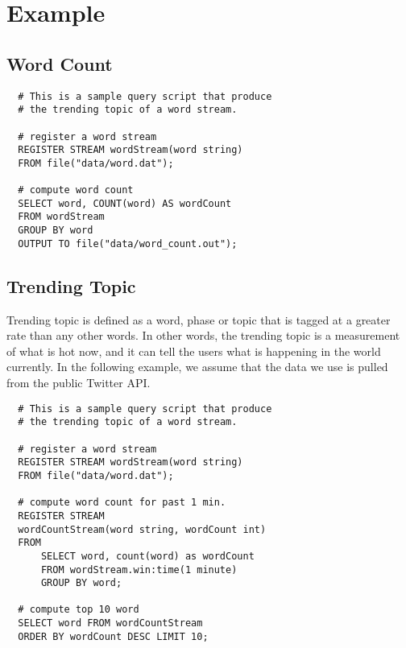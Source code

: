 \documentclass[conference, twocolumn, twoside, 11pt]{IEEEtran}
\theoremstyle{definition}
\begin{document}
\section{Example}\label{example}
\subsection{Word Count}
\footnotesize\begin{verbatim}
  # This is a sample query script that produce
  # the trending topic of a word stream.

  # register a word stream
  REGISTER STREAM wordStream(word string)
  FROM file("data/word.dat");

  # compute word count
  SELECT word, COUNT(word) AS wordCount
  FROM wordStream
  GROUP BY word
  OUTPUT TO file("data/word_count.out");
\end{verbatim}
\normalsize
\subsection{Trending Topic}
Trending topic is defined as a word, phase or topic that is tagged at a greater rate than any other words. In other words, the trending topic is a measurement of what is hot now, and it
can tell the users what is happening in the world currently. In the following example, we assume that the data we use is pulled from the public Twitter API.
\footnotesize\begin{verbatim}
  # This is a sample query script that produce
  # the trending topic of a word stream.

  # register a word stream
  REGISTER STREAM wordStream(word string)
  FROM file("data/word.dat");

  # compute word count for past 1 min.
  REGISTER STREAM
  wordCountStream(word string, wordCount int)
  FROM
      SELECT word, count(word) as wordCount
      FROM wordStream.win:time(1 minute)
      GROUP BY word;

  # compute top 10 word
  SELECT word FROM wordCountStream
  ORDER BY wordCount DESC LIMIT 10;
\end{verbatim}
\normalsize
\end{document}
